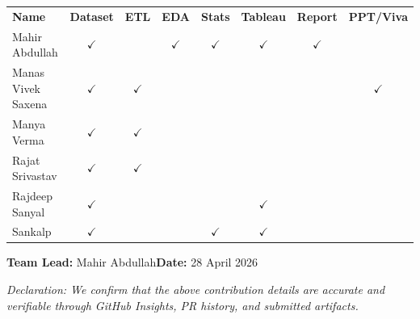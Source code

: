 \documentclass[11pt,a4paper]{article}
\begin{document}
\vspace{6pt}
{\footnotesize\setlength{\tabcolsep}{4pt}
\begin{tabularx}{\linewidth}{@{}p{3.0cm} CCCCCCC@{}}
  {\color{white}\bfseries Name} &
  {\color{white}\bfseries Dataset} &
  {\color{white}\bfseries ETL} &
  {\color{white}\bfseries EDA} &
  {\color{white}\bfseries Stats} &
  {\color{white}\bfseries Tableau} &
  {\color{white}\bfseries Report} &
  {\color{white}\bfseries PPT/Viva} \\
  Mahir Abdullah     & $\checkmark$ &              & $\checkmark$ & $\checkmark$ & $\checkmark$ & $\checkmark$ & \\
  Manas Vivek Saxena & $\checkmark$ & $\checkmark$ &              &              &              &              & $\checkmark$ \\
  Manya Verma        & $\checkmark$ & $\checkmark$ &              &              &              &              & \\
  Rajat Srivastav    & $\checkmark$ & $\checkmark$ &              &              &              &              & \\
  Rajdeep Sanyal     & $\checkmark$ &              &              &              & $\checkmark$ &              & \\
  Sankalp            & $\checkmark$ &              &              & $\checkmark$ & $\checkmark$ &              & \\
  \bottomrule
\end{tabularx}}

\vspace{1.2cm}
\noindent\textbf{Team Lead:} Mahir Abdullah\qquad\textbf{Date:} 28 April 2026

\vspace{0.6cm}
{\small\color{rhoGray}\itshape Declaration: We confirm that the above contribution details are accurate and verifiable through GitHub Insights, PR history, and submitted artifacts.}
\end{document}
